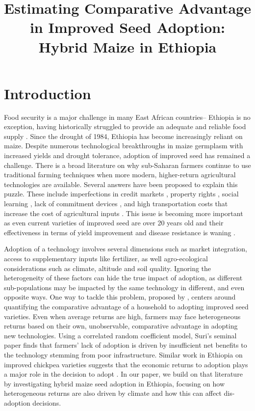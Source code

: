 \documentclass{article}
\title{Estimating Comparative Advantage in Improved Seed Adoption: Hybrid Maize in Ethiopia}
\begin{document}
\maketitle

\section{Introduction}

Food security is a major challenge in many East African countries-- Ethiopia is no exception, having historically struggled to provide an adequate and reliable food supply \citep{Ramakrishna2002-hv, Jaleta2018-oj}. Since the drought of 1984, Ethiopia has become increasingly reliant on maize. Despite numerous technological breakthroughs in maize germplasm with increased yields and drought tolerance, adoption of improved seed has remained a challenge. There is a broad literature on why sub-Saharan farmers continue to use traditional farming techniques when more modern, higher-return agricultural technologies are available. Several answers have been proposed to explain this puzzle. These include imperfections in credit markets \citep{Croppenstedt2003-pq}, property rights \citep{Place2000-el}, social learning \citep{Conley2010-ue,Foster1995-bz,Munshi2004-og}, lack of commitment devices \cite{Duflo2009-iv}, and high transportation costs that increase the cost of agricultural inputs \citep{Byerlee2013-qk}. This issue is becoming more important as even current varieties of improved seed are over 20 years old and their effectiveness in terms of yield improvement and disease resistance is waning \citep{Abate2015-rj}. 

Adoption of a technology involves several dimensions such as market integration, access to supplementary inputs like fertilizer, as well agro-ecological considerations such as climate, altitude and soil quality. Ignoring the heterogeneity of these factors can hide the true impact of adoption, as different sub-populations may be impacted by the same technology in different, and even opposite ways. One way to tackle this problem, proposed by \citep{Suri2011-oi}, centers around quantifying the comparative advantage of a household to adopting improved seed varieties. Even when average returns are high, farmers may face heterogeneous returns based on their own, unobservable, comparative advantage in adopting new technologies. Using a correlated random coefficient model, Suri’s seminal paper finds that farmers’ lack of adoption is driven by insufficient net benefits to the technology stemming from poor infrastructure. Similar work in Ethiopia on improved chickpea varieties suggests that the economic returns to adoption plays a major role in the decision to adopt \citep{Michler2018-wk}. In our paper, we build on that literature by investigating hybrid maize seed adoption in Ethiopia, focusing on how heterogeneous returns are also driven by climate and how this can affect dis-adoption decisions.
\end{document}
